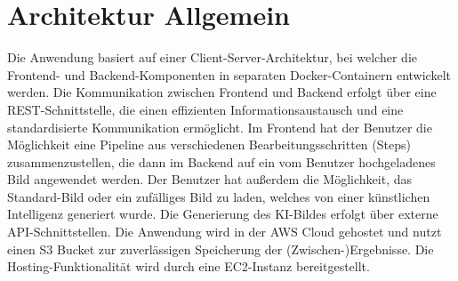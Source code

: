 \section{Architektur Allgemein}
Die Anwendung basiert auf einer Client-Server-Architektur, bei welcher die Frontend- und Backend-Komponenten in separaten Docker-Containern entwickelt werden. Die Kommunikation zwischen Frontend und Backend erfolgt über eine REST-Schnittstelle, die einen effizienten Informationsaustausch und eine standardisierte Kommunikation ermöglicht. Im Frontend hat der Benutzer die Möglichkeit eine Pipeline aus verschiedenen Bearbeitungsschritten (Steps) zusammenzustellen, die dann im Backend auf ein vom Benutzer hochgeladenes Bild angewendet werden. Der Benutzer hat außerdem die Möglichkeit, das Standard-Bild oder ein zufälliges Bild zu laden, welches von einer künstlichen Intelligenz generiert wurde. Die Generierung des KI-Bildes erfolgt über externe API-Schnittstellen. Die Anwendung wird in der AWS Cloud gehostet und nutzt einen S3 Bucket zur zuverlässigen Speicherung der (Zwischen-)Ergebnisse. Die Hosting-Funktionalität wird durch eine EC2-Instanz bereitgestellt.